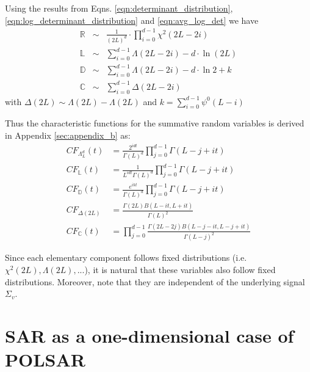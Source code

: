 \documentclass[journal]{IEEEtran}
\begin{document}
Using the results from Eqns. \ref{eqn:determinant_distribution}, \ref{eqn:log_determinant_distribution} and \ref{eqn:avg_log_det} we have
\begin{eqnarray}
\mathbb{R} &\sim& \frac{1}{(2L)^d} \cdot \prod_{i=0}^{d-1} \chi^2 (2L-2i) \label{eqn:determinant_ratio_distribution} \\
\mathbb{L} &\sim&  \sum^{d-1}_{i=0} \Lambda(2L-2i) - d \cdot \ln(2L)
\label{eqn:log_determinant_distance_distribution} \\ 
 \mathbb{D} &\sim& \sum^{d-1}_{i=0} \Lambda(2L-2i) - d \cdot \ln{2} + k
\label{eqn:dispersion_distribution} \\ 
 \mathbb{C} &\sim& \sum^{d-1}_{i=0} \Delta(2L-2i)
\label{eqn:contrast_distribution}  
\end{eqnarray}
with $\Delta(2L) \sim \Lambda(2L) - \Lambda(2L)$
and $k=\sum^{d-1}_{i=0} \psi^0(L-i)$

Thus the characteristic functions for the summative random variables is derived in Appendix \ref{sec:appendix_b} as:
\begin{align}
  CF_{\Lambda^d_L}(t) &= \frac{2^{idt}}{\Gamma(L)^d} \prod^{d-1}_{j=0} \Gamma(L-j+it) \\
  CF_{\mathbb{L}}(t) &= \frac{1}{L^{idt} \Gamma(L)^d} \prod^{d-1}_{j=0} \Gamma(L-j+it) \\
  CF_{\mathbb{D}}(t) &= \frac{e^{ikt}}{\Gamma(L)^d} \prod^{d-1}_{j=0} \Gamma(L-j+it) \\
  CF_{\Delta(2L)} &= \frac{\Gamma(2L) B(L-it,L+it)}{\Gamma(L)^2} \\
  CF_{\mathbb{C}}(t) &=  \prod^{d-1}_{j=0} \frac{\Gamma(2L-2j) B(L-j-it,L-j+it)}{\Gamma(L-j)^2}
\end{align}

Since each elementary component follows fixed distributions (i.e. $\chi^2(2L), \Lambda(2L), ... $),
  it is natural that these variables also follow fixed distributions.
Moreover, note that they are independent of the underlying signal $\Sigma_v$.

\section{SAR as a one-dimensional case of POLSAR}
\label{sec:sar_special_case_of_polsar}
\end{document}
